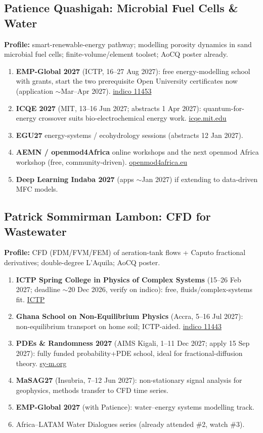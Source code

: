 \documentclass[11pt,a4paper]{article}
\begin{document}
\subsection{Patience Quashigah: Microbial Fuel Cells \& Water}
\textbf{Profile:} smart-renewable-energy pathway; modelling porosity dynamics in sand microbial fuel cells; finite-volume/element toolset; AoC\textbar Q poster already.
\begin{enumerate}[leftmargin=1.6em]
  \item \textbf{EMP-Global 2027} (ICTP, 16--27 Aug 2027): free energy-modelling school with grants, start the two prerequisite Open University certificates now (application $\sim$Mar--Apr 2027). \href{https://indico.ictp.it/event/11453}{indico 11453}
  \item \textbf{ICQE 2027} (MIT, 13--16 Jun 2027; abstracts 1 Apr 2027): quantum-for-energy crossover suits bio-electrochemical energy work. \href{https://icqe.mit.edu/}{icqe.mit.edu}
  \item \textbf{EGU27} energy-systems / ecohydrology sessions (abstracts 12 Jan 2027).
  \item \textbf{AEMN / openmod4Africa} online workshops and the next openmod Africa workshop (free, community-driven). \href{https://openmod4africa.eu/}{openmod4africa.eu}
  \item \textbf{Deep Learning Indaba 2027} (apps $\sim$Jan 2027) if extending to data-driven MFC models.
\end{enumerate}

\subsection{Patrick Sommirman Lambon: CFD for Wastewater}
\textbf{Profile:} CFD (FDM/FVM/FEM) of aeration-tank flows + Caputo fractional derivatives; double-degree L'Aquila; AoC\textbar Q poster.
\begin{enumerate}[leftmargin=1.6em]
  \item \textbf{ICTP Spring College in Physics of Complex Systems} (15--26 Feb 2027; deadline $\sim$20 Dec 2026, verify on indico): free, fluids/complex-systems fit. \href{https://www.ictp.it/home/scientific-calendar}{ICTP}
  \item \textbf{Ghana School on Non-Equilibrium Physics} (Accra, 5--16 Jul 2027): non-equilibrium transport on home soil; ICTP-aided. \href{https://indico.ictp.it/event/11443/}{indico 11443}
  \item \textbf{PDEs \& Randomness 2027} (AIMS Kigali, 1--11 Dec 2027; apply 15 Sep 2027): fully funded probability+PDE school, ideal for fractional-diffusion theory. \href{https://sy-m.org/pdes-and-randomness.html}{sy-m.org}
  \item \textbf{MaSAG27} (Insubria, 7--12 Jun 2027): non-stationary signal analysis for geophysics, methods transfer to CFD time series.
  \item \textbf{EMP-Global 2027} (with Patience): water--energy systems modelling track.
  \item Africa--LATAM Water Dialogues series (already attended \#2, watch \#3).
\end{enumerate}
\end{document}
